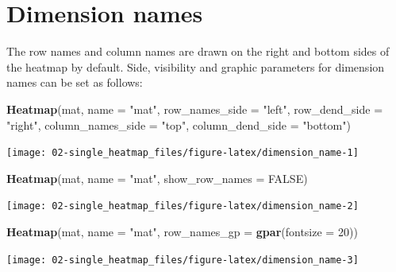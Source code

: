 \documentclass[]{book}
\newenvironment{Shaded}{\begin{snugshade}}{\end{snugshade}}
\newcommand{\KeywordTok}[1]{\textcolor[rgb]{0.13,0.29,0.53}{\textbf{#1}}}
\newcommand{\DataTypeTok}[1]{\textcolor[rgb]{0.13,0.29,0.53}{#1}}
\newcommand{\DecValTok}[1]{\textcolor[rgb]{0.00,0.00,0.81}{#1}}
\newcommand{\StringTok}[1]{\textcolor[rgb]{0.31,0.60,0.02}{#1}}
\newcommand{\OtherTok}[1]{\textcolor[rgb]{0.56,0.35,0.01}{#1}}
\newcommand{\NormalTok}[1]{#1}
\theoremstyle{definition}
\theoremstyle{definition}
\theoremstyle{definition}
\theoremstyle{remark}
\begin{document}
\section{Dimension names}\label{dimension-names}

The row names and column names are drawn on the right and bottom sides
of the heatmap by default. Side, visibility and graphic parameters for
dimension names can be set as follows:

\begin{Shaded}
\begin{Highlighting}[]
\KeywordTok{Heatmap}\NormalTok{(mat, }\DataTypeTok{name =} \StringTok{"mat"}\NormalTok{, }\DataTypeTok{row_names_side =} \StringTok{"left"}\NormalTok{, }\DataTypeTok{row_dend_side =} \StringTok{"right"}\NormalTok{, }
    \DataTypeTok{column_names_side =} \StringTok{"top"}\NormalTok{, }\DataTypeTok{column_dend_side =} \StringTok{"bottom"}\NormalTok{)}
\end{Highlighting}
\end{Shaded}

\begin{center}\texttt{[image: 02-single\_heatmap\_files/figure-latex/dimension\_name-1]} \end{center}

\begin{Shaded}
\begin{Highlighting}[]
\KeywordTok{Heatmap}\NormalTok{(mat, }\DataTypeTok{name =} \StringTok{"mat"}\NormalTok{, }\DataTypeTok{show_row_names =} \OtherTok{FALSE}\NormalTok{)}
\end{Highlighting}
\end{Shaded}

\begin{center}\texttt{[image: 02-single\_heatmap\_files/figure-latex/dimension\_name-2]} \end{center}

\begin{Shaded}
\begin{Highlighting}[]
\KeywordTok{Heatmap}\NormalTok{(mat, }\DataTypeTok{name =} \StringTok{"mat"}\NormalTok{, }\DataTypeTok{row_names_gp =} \KeywordTok{gpar}\NormalTok{(}\DataTypeTok{fontsize =} \DecValTok{20}\NormalTok{))}
\end{Highlighting}
\end{Shaded}

\begin{center}\texttt{[image: 02-single\_heatmap\_files/figure-latex/dimension\_name-3]} \end{center}
\end{document}
